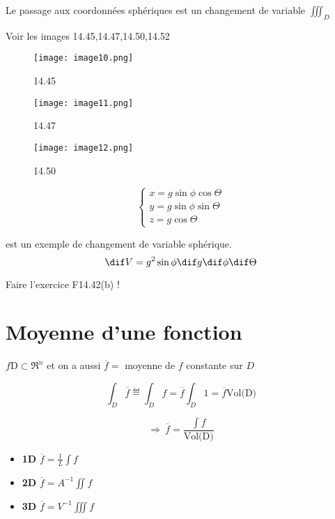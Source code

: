 Le passage aux coordonnées sphériques est un changement de variable $\iiint_D$
\begin{myrem}

Voir les images 14.45,14.47,14.50,14.52
\begin{figure}


\texttt{[image: image10.png]}
\caption{14.45}
\end{figure}

\begin{figure}
\texttt{[image: image11.png]}
\caption{14.47}
\end{figure}

\begin{figure}
\texttt{[image: image12.png]}
\caption{14.50}
\end{figure}


\end{myrem}
$$
\left\{
\begin{array}{l}

x=g\sin\phi \cos\Theta\\
y=g\sin\phi \sin\Theta\\
z=g\cos\Theta

\end{array}
\right.
$$

est un exemple de changement de variable sphérique.
\[\dif V=g^2\sin\phi \dif g\dif\phi \dif\Theta \]

Faire l'exercice F14.42(b) !



\section{Moyenne d'une fonction}
$f\text{D} \subset \Re ^n$ et on a aussi $\overline{f} = $ moyenne de $f$ constante sur $D$

\[\int_D \overline{f} \eqdef \int_D f = \overline{f}\int_D 1 = \overline{f}\text{Vol(D)}\]

$$\Rightarrow\ \overline{f} = \frac{\int f}{\text{Vol(D)}}$$
\begin{itemize}
\item \textbf{1D} $\overline{f}=\frac{1}{L}\int f$
\item \textbf{2D} $\overline{f}=A^{-1}\iint f$
\item \textbf{3D} $\overline{f} = V^{-1}\iiint f$
\end{itemize}
